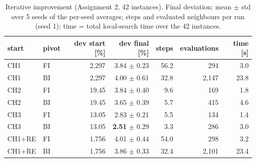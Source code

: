 \begin{table}[t]
\centering\small
\caption{Iterative improvement (Assignment 2, 42 instances). Final deviation: mean $\pm$ std over 5 seeds of the per-seed averages; steps and evaluated neighbours per run (seed 1); time = total local-search time over the 42 instances.}
\label{tab:ls}
\begin{tabular}{llrrrrr}
\toprule
start & pivot & dev start [\%] & dev final [\%] & steps & evaluations & time [s] \\
\midrule
CH1 & FI & 2,297 & 3.84 $\pm$ 0.23 & 56.2 & 294 & 3.0 \\
CH1 & BI & 2,297 & 4.00 $\pm$ 0.61 & 32.8 & 2,147 & 23.8 \\
CH2 & FI & 19.45 & 3.84 $\pm$ 0.40 & 9.6 & 169 & 1.8 \\
CH2 & BI & 19.45 & 3.65 $\pm$ 0.39 & 5.7 & 415 & 4.6 \\
CH3 & FI & 13.05 & 2.83 $\pm$ 0.21 & 5.5 & 134 & 1.4 \\
CH3 & BI & 13.05 & \textbf{2.51} $\pm$ 0.29 & 3.3 & 286 & 3.0 \\
CH1+RE & FI & 1,756 & 4.01 $\pm$ 0.44 & 54.0 & 298 & 3.2 \\
CH1+RE & BI & 1,756 & 3.86 $\pm$ 0.33 & 32.4 & 2,101 & 23.4 \\
\bottomrule
\end{tabular}
\end{table}
